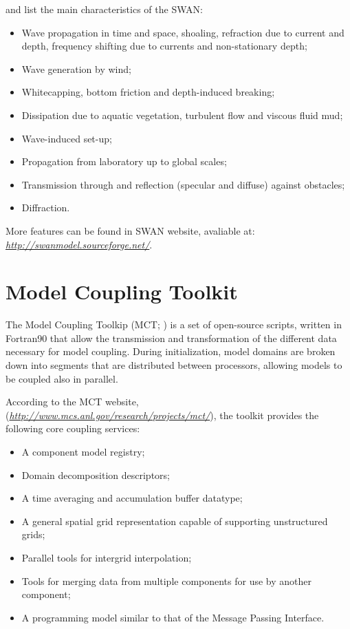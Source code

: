 \noindent \textcite{Dasilva2013} and \textcite{Booij1999,Booij1996} list the main characteristics of the SWAN:
\bigskip

\begin{itemize}
\item Wave propagation in time and space, shoaling, refraction due to current and depth, frequency shifting due to currents and non-stationary depth;
\item Wave generation by wind;
\item Whitecapping, bottom friction and depth-induced breaking;
\item Dissipation due to aquatic vegetation, turbulent flow and viscous fluid mud;
\item Wave-induced set-up;
\item Propagation from laboratory up to global scales;
\item Transmission through and reflection (specular and diffuse) against obstacles;
\item Diffraction.
\end{itemize}
\bigskip

More features can be found in SWAN website, avaliable at: \textcolor{bleu_cite}{\href{http://swanmodel.sourceforge.net/}{\textit{http://swanmodel.sourceforge.net/}}}.

\section{Model Coupling Toolkit}\label{mctsecao}
\bigskip

\noindent  The Model Coupling Toolkip (MCT; \cite{Larson2005, Jacob2005, Warner2008}) is a set of open-source scripts, written in Fortran90 that allow the transmission 
and transformation of the different data necessary for model coupling. During initialization, model domains are broken down into segments that are distributed
between processors, allowing models to be coupled also in parallel.
\bigskip

\noindent According to the MCT website, (\textcolor{bleu_cite}{\href{http://www.mcs.anl.gov/research/projects/mct/}{\textit{http://www.mcs.anl.gov/research/projects/mct/}}}), 
the toolkit provides the following core coupling services:
\bigskip

\begin{itemize}
\item A component model registry;
\item Domain decomposition descriptors;
\item A time averaging and accumulation buffer datatype;
\item A general spatial grid representation capable of supporting unstructured grids;
\item Parallel tools for intergrid interpolation;
\item Tools for merging data from multiple components for use by another component;
\item A programming model similar to that of the Message Passing Interface. 
\end{itemize}
\bigskip


